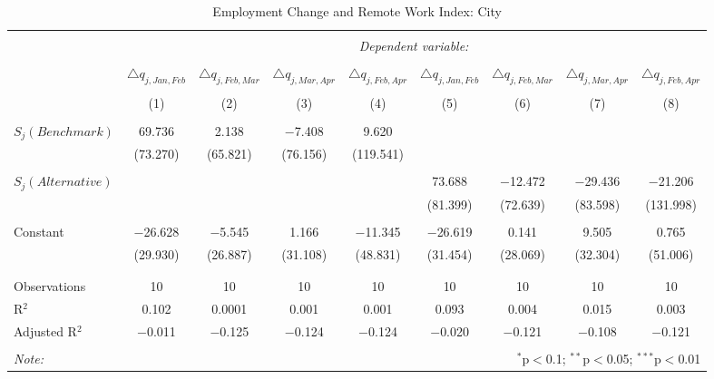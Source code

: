 
\begin{table}[!htbp] \centering 
  \caption{Employment Change and Remote Work Index: City} 
  \label{tab:regression_dynamics_city} 
\footnotesize 
\begin{tabular}{@{\extracolsep{5pt}}lcccccccc} 
\\[-1.8ex]\hline 
\hline \\[-1.8ex] 
 & \multicolumn{8}{c}{\textit{Dependent variable:}} \\ 
\cline{2-9} 
\\[-1.8ex] & $\triangle q_{j,Jan,Feb}$ & $\triangle q_{j,Feb,Mar}$ & $\triangle q_{j,Mar,Apr}$ & $\triangle q_{j,Feb,Apr}$ & $\triangle q_{j,Jan,Feb}$ & $\triangle q_{j,Feb,Mar}$ & $\triangle q_{j,Mar,Apr}$ & $\triangle q_{j,Feb,Apr}$ \\ 
\\[-1.8ex] & (1) & (2) & (3) & (4) & (5) & (6) & (7) & (8)\\ 
\hline \\[-1.8ex] 
 $S_{j}(Benchmark)$ & 69.736 & 2.138 & $-$7.408 & 9.620 &  &  &  &  \\ 
  & (73.270) & (65.821) & (76.156) & (119.541) &  &  &  &  \\ 
  & & & & & & & & \\ 
 $S_{j}(Alternative)$ &  &  &  &  & 73.688 & $-$12.472 & $-$29.436 & $-$21.206 \\ 
  &  &  &  &  & (81.399) & (72.639) & (83.598) & (131.998) \\ 
  & & & & & & & & \\ 
 Constant & $-$26.628 & $-$5.545 & 1.166 & $-$11.345 & $-$26.619 & 0.141 & 9.505 & 0.765 \\ 
  & (29.930) & (26.887) & (31.108) & (48.831) & (31.454) & (28.069) & (32.304) & (51.006) \\ 
  & & & & & & & & \\ 
\hline \\[-1.8ex] 
Observations & 10 & 10 & 10 & 10 & 10 & 10 & 10 & 10 \\ 
R$^{2}$ & 0.102 & 0.0001 & 0.001 & 0.001 & 0.093 & 0.004 & 0.015 & 0.003 \\ 
Adjusted R$^{2}$ & $-$0.011 & $-$0.125 & $-$0.124 & $-$0.124 & $-$0.020 & $-$0.121 & $-$0.108 & $-$0.121 \\ 
\hline 
\hline \\[-1.8ex] 
\textit{Note:}  & \multicolumn{8}{r}{$^{*}$p$<$0.1; $^{**}$p$<$0.05; $^{***}$p$<$0.01} \\ 
\end{tabular} 
\end{table} 
